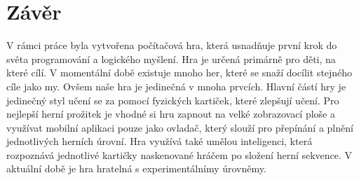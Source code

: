\chapter{Závěr}

V rámci práce byla vytvořena počítačová hra, která usnadňuje první krok do světa programování a logického myšlení. Hra je určená primárně pro děti, na které cílí. V momentální době existuje mnoho her, které se snaží docílit stejného cíle jako my. Ovšem naše hra je jedinečná v mnoha prvcích. Hlavní částí hry je jedinečný styl učení se za pomocí fyzických kartiček, které zlepšují učení. Pro nejlepší herní prožitek je vhodné si hru zapnout na velké zobrazovací ploše a využívat mobilní aplikaci pouze jako ovladač, který slouží pro přepínání a plnění jednotlivých herních úrovní. Hra využívá také umělou inteligenci, která rozpoznává jednotlivé kartičky naskenované hráčem po složení herní sekvence. V aktuální době je hra hratelná s experimentálnímy úrovněmy.